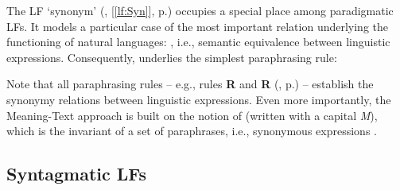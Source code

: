 The LF  `synonym' (, [\ref{lf:Syn}], p.\thinspace\pageref{lf:Syn}) occupies a special place among paradigmatic LFs. It models a particular case of the most important relation underlying the functioning of natural languages: , i.e., semantic equivalence between linguistic expressions. Consequently,  underlies the simplest paraphrasing rule:

\begin{center}
\end{center}\label{txt:RSyn}

Note that all paraphrasing rules -- e.g., rules \textbf{R} and \textbf{R} (, p.\thinspace\pageref{txt:RParaphMult}) -- establish the synonymy relations between linguistic expressions. Even more importantly, the Meaning-Text approach is built on the notion of  (written with a capital \textit{M}), which is the invariant of a set of paraphrases, i.e., synonymous expressions \parencites[10--11]{Melcuk1974}[44--45]{Melcuk2012a-e}[102--103]{MelcukMilicevic2014a}.

\subsection{Syntagmatic LFs}\label{sec:classeFLSyntagmatiques}

